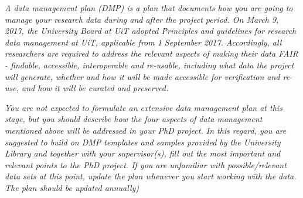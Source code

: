 %
%
\textit{A data management plan (DMP) is a plan that documents how you are going to manage your research data during and after the project period. On March 9, 2017, the University Board at UiT adopted Principles and guidelines for research data management at UiT, applicable from 1 September 2017. Accordingly, all researchers are required to address the relevant aspects of making their data FAIR - findable, accessible, interoperable and re-usable, including what data the project will generate, whether and how it will be made accessible for verification and re-use, and how it will be curated and preserved.
}

\textit{You are not expected to formulate an extensive data management plan at this stage, but you should describe how the four aspects of data management mentioned above will be addressed in your PhD project. In this regard, you are suggested to build on DMP templates and samples provided by the University Library and together with your supervisor(s), fill out the most important and relevant points to the PhD project. If you are unfamiliar with possible/relevant data sets at this point, update the plan whenever you start working with the data. The plan should be updated annually)}
